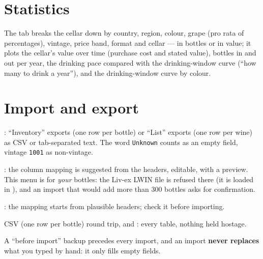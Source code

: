 \documentclass[11pt,a4paper]{article}
\begin{document}

\section{Statistics}
The  tab breaks the cellar down by country, region, colour, grape (pro rata of percentages),
vintage, price band, format and cellar — in bottles or in value; it plots the cellar's value over time
(purchase cost and stated value), bottles in and out per year, the drinking pace compared with the
drinking-window curve (``how many to drink a year''), and the drinking-window curve by colour.


\section{Import and export}
\label{sec:imports}
\begin{description}[style=nextline,leftmargin=1.2em]
  \item[CellarTracker] : ``Inventory'' exports (one row per
    bottle) or ``List'' exports (one row per wine) as CSV or tab-separated text. The word \texttt{Unknown}
    counts as an empty field, vintage \texttt{1001} as non-vintage.
  \item[Excel, CSV] : the column mapping is suggested from the
    headers, editable, with a preview. This menu is for \emph{your} bottles: the Liv-ex LWIN file is refused
    there (it is loaded in ), and an import that would add more than
    300 bottles asks for confirmation.
  \item[Vivino] : the mapping starts from plausible headers; check it
    before importing.
  \item[Vendémiaire] CSV (one row per bottle) round trip, and : every
    table, nothing held hostage.
\end{description}
A ``before import'' backup precedes every import, and an import \textbf{never replaces} what you typed by
hand: it only fills empty fields.
\end{document}
